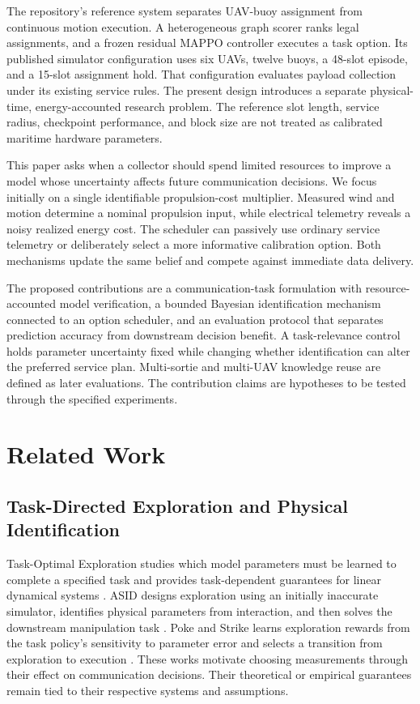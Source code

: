 \documentclass[10pt,twocolumn,letterpaper]{article}
\begin{document}
The repository's reference system separates UAV-buoy assignment from continuous motion execution. A heterogeneous graph scorer ranks legal assignments, and a frozen residual MAPPO controller executes a task option. Its published simulator configuration uses six UAVs, twelve buoys, a 48-slot episode, and a 15-slot assignment hold. That configuration evaluates payload collection under its existing service rules. The present design introduces a separate physical-time, energy-accounted research problem. The reference slot length, service radius, checkpoint performance, and block size are not treated as calibrated maritime hardware parameters.

This paper asks when a collector should spend limited resources to improve a model whose uncertainty affects future communication decisions. We focus initially on a single identifiable propulsion-cost multiplier. Measured wind and motion determine a nominal propulsion input, while electrical telemetry reveals a noisy realized energy cost. The scheduler can passively use ordinary service telemetry or deliberately select a more informative calibration option. Both mechanisms update the same belief and compete against immediate data delivery.

The proposed contributions are a communication-task formulation with resource-accounted model verification, a bounded Bayesian identification mechanism connected to an option scheduler, and an evaluation protocol that separates prediction accuracy from downstream decision benefit. A task-relevance control holds parameter uncertainty fixed while changing whether identification can alter the preferred service plan. Multi-sortie and multi-UAV knowledge reuse are defined as later evaluations. The contribution claims are hypotheses to be tested through the specified experiments.

\section{Related Work}
\subsection{Task-Directed Exploration and Physical Identification}
Task-Optimal Exploration studies which model parameters must be learned to complete a specified task and provides task-dependent guarantees for linear dynamical systems \cite{wagenmaker2021task}. ASID designs exploration using an initially inaccurate simulator, identifies physical parameters from interaction, and then solves the downstream manipulation task \cite{memmel2024asid}. Poke and Strike learns exploration rewards from the task policy's sensitivity to parameter error and selects a transition from exploration to execution \cite{aoyama2025poke}. These works motivate choosing measurements through their effect on communication decisions. Their theoretical or empirical guarantees remain tied to their respective systems and assumptions.
\end{document}
